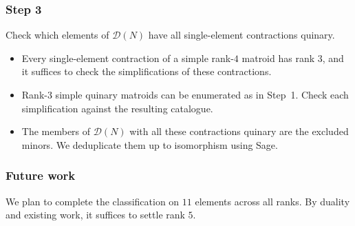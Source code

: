\documentclass{beamer}
\begin{document}
\begin{frame}
  \frametitle{Step 3}
  Check which elements of $\mathcal D(N)$ have all single-element
  contractions quinary.
  \begin{itemize}
    \item Every single-element contraction of a simple rank-$4$ matroid
      has rank $3$, and it suffices to check the simplifications of
      these contractions.
    \item Rank-$3$ simple quinary matroids can be enumerated as in
      Step~1. Check each simplification against the resulting catalogue.
    \item The members of $\mathcal D(N)$ with all these contractions quinary
      are the excluded minors. We deduplicate them up to isomorphism
      using Sage.
  \end{itemize}
\end{frame}

\begin{frame}
  \frametitle{Future work}
  We plan to complete the classification on $11$ elements across all
  ranks. By duality and existing work, it suffices to settle rank $5$.
\end{frame}
\end{document}
